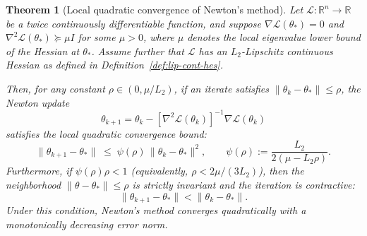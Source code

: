 \documentclass{article}
\theoremstyle{plain}
\newtheorem{theorem}{Theorem}
\theoremstyle{definition}
\theoremstyle{remark}
\begin{document}
\begin{theorem}[Local quadratic convergence of Newton’s method]
\label{theorem:newton-local-quad}
Let $\mathcal{L}:\mathbb{R}^n\to\mathbb{R}$ be a twice continuously differentiable function,
and suppose $\nabla \mathcal{L}(\theta_*) = 0$ and 
$\nabla^2 \mathcal{L}(\theta_*) \succeq \mu I$ for some $\mu > 0$, 
where $\mu$ denotes the local eigenvalue lower bound of the Hessian at $\theta_*$.
Assume further that $\mathcal{L}$ has an $L_2$-Lipschitz continuous Hessian as defined in Definition~\ref{def:lip-cont-hes}.

Then, for any constant $\rho \in (0, \mu/L_2)$, if an iterate satisfies $\|\theta_k - \theta_*\| \le \rho$, the Newton update
\[
\theta_{k+1}=\theta_k-[\nabla^2 \mathcal{L}(\theta_k)]^{-1}\nabla \mathcal{L}(\theta_k)
\]
satisfies the local quadratic convergence bound:
\[
\|\theta_{k+1} - \theta_*\|
\;\le\;
\psi(\rho)\,\|\theta_k - \theta_*\|^2,
\qquad
\psi(\rho) := \frac{L_2}{2(\mu - L_2 \rho)}.
\]
Furthermore, if $\psi(\rho)\rho < 1$ (equivalently, $\rho < 2\mu/(3L_2)$), then the neighborhood $\|\theta - \theta_*\| \le \rho$ is strictly invariant and the iteration is contractive:
\[
\|\theta_{k+1} - \theta_*\| < \|\theta_k - \theta_*\|.
\]
Under this condition, Newton’s method converges quadratically with a monotonically decreasing error norm.
\end{theorem}
\end{document}
